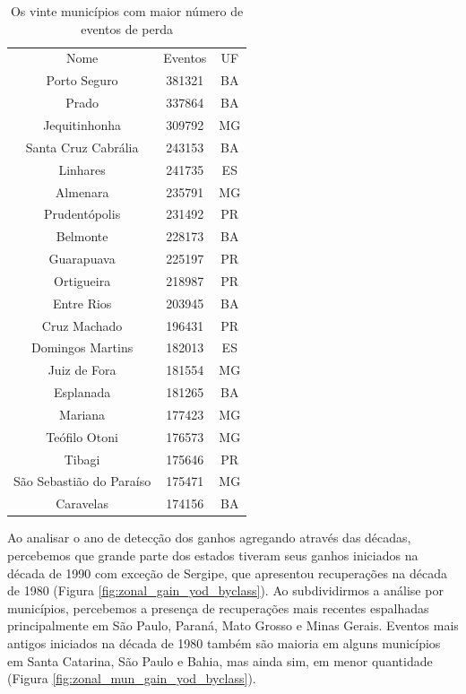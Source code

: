 \begin{table}[H]
    \centering
    \begin{tabular}{|c | c | c|}
    \hline
                            Nome & Eventos & UF \\
                Porto Seguro & 381321 & BA \\ 
                       Prado & 337864 & BA \\
                Jequitinhonha & 309792 & MG \\
        Santa Cruz Cabrália & 243153 & BA \\
                    Linhares & 241735 & ES \\
                      Almenara & 235791 & MG \\
              Prudentópolis & 231492 & PR \\
                    Belmonte & 228173 & BA \\
                  Guarapuava & 225197 & PR \\
                  Ortigueira & 218987 & PR \\
                  Entre Rios & 203945 & BA \\
                   Cruz Machado & 196431 & PR \\
            Domingos Martins & 182013 & ES \\
                 Juiz de Fora & 181554 & MG \\
                   Esplanada & 181265 & BA \\
                      Mariana & 177423 & MG \\
               Teófilo Otoni & 176573 & MG \\
                      Tibagi & 175646 & PR \\
  São Sebastião do Paraíso & 175471 & MG \\
                   Caravelas & 174156 & BA \\
    \hline
    \end{tabular}
    \caption{Os vinte municípios com maior número de eventos de perda}
    \label{tab:mun_gain}
\end{table}

Ao analisar o ano de detecção dos ganhos agregando através das décadas, percebemos que grande parte dos estados tiveram seus ganhos iniciados na década de 1990 com exceção de Sergipe, que apresentou recuperações na década de 1980 (Figura \ref{fig:zonal_gain_yod_byclass}). Ao subdividirmos a análise por municípios, percebemos a presença de recuperações mais recentes espalhadas principalmente em São Paulo, Paraná, Mato Grosso e Minas Gerais. Eventos mais antigos iniciados na década de 1980 também são maioria em alguns municípios em Santa Catarina, São Paulo e Bahia, mas ainda sim, em menor quantidade (Figura \ref{fig:zonal_mun_gain_yod_byclass}).  

